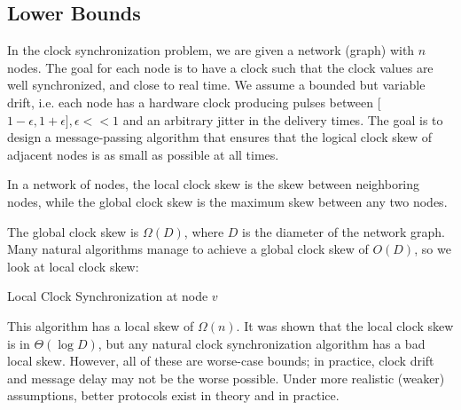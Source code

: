 \subsection{Lower Bounds}

In the clock synchronization problem, we are given a network (graph) with $n$ nodes. The goal for each node is to have a clock such that the clock values are well synchronized, and close to real time. We assume a bounded but variable drift, i.e. each node has a hardware clock producing pulses between [$1-\epsilon,1+\epsilon], \epsilon << 1$ and an arbitrary jitter in the delivery times. The goal is to design a message-passing algorithm that ensures that the logical clock skew of adjacent nodes is as small as possible at all times.\medskip

In a network of nodes, the local clock skew is the skew between neighboring nodes, while the global clock skew is the maximum skew between any two nodes.\medskip

The global clock skew is $\Omega(D)$, where $D$ is the diameter of the network graph. Many natural algorithms manage to achieve a global clock skew of $O(D)$, so we look at local clock skew:\medskip

\begin{algorithm}[H]
\caption{Local Clock Synchronization at node $v$}
\end{algorithm}
\medskip

This algorithm has a local skew of $\Omega(n)$. It was shown that the local clock skew is in $\Theta(\log D)$, but any natural clock synchronization algorithm has a bad local skew. However, all of these are worse-case bounds; in practice, clock drift and message delay may not be the worse possible. Under more realistic (weaker) assumptions, better protocols exist in theory and in practice.
